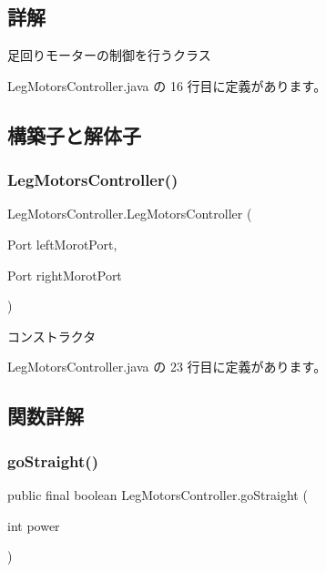 \subsection{詳解}
足回りモーターの制御を行うクラス 

 Leg\+Motors\+Controller.\+java の 16 行目に定義があります。



\subsection{構築子と解体子}
\mbox{\label{class_leg_motors_controller_afb404bdad1a5ce5d9f71b73ade3ccbb5}} 
\subsubsection{\texorpdfstring{LegMotorsController()}{LegMotorsController()}}
{\footnotesize\ttfamily Leg\+Motors\+Controller.\+Leg\+Motors\+Controller (\begin{DoxyParamCaption}\item[{Port}]{left\+Morot\+Port,  }\item[{Port}]{right\+Morot\+Port }\end{DoxyParamCaption})\hspace{0.3cm}{\ttfamily [inline]}}

コンストラクタ 

 Leg\+Motors\+Controller.\+java の 23 行目に定義があります。



\subsection{関数詳解}
\mbox{\label{class_leg_motors_controller_ad5a3db7ac941bb2e66d3efb5e3214a54}} 
\subsubsection{\texorpdfstring{goStraight()}{goStraight()}}
{\footnotesize\ttfamily public final boolean Leg\+Motors\+Controller.\+go\+Straight (\begin{DoxyParamCaption}\item[{int}]{power }\end{DoxyParamCaption})\hspace{0.3cm}{\ttfamily [inline]}}



